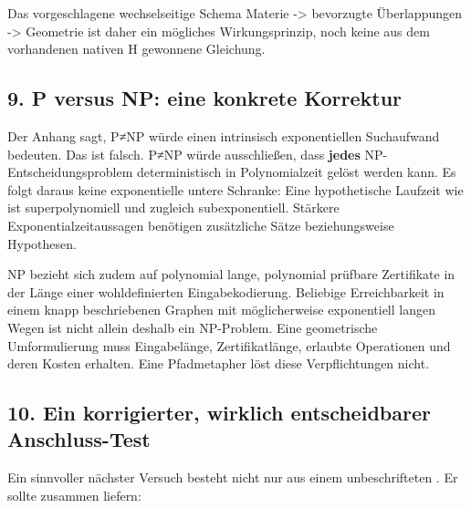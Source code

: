 Das vorgeschlagene wechselseitige Schema Materie -\textgreater{}
bevorzugte Überlappungen -\textgreater{} Geometrie ist daher ein
mögliches Wirkungsprinzip, noch keine aus dem vorhandenen nativen H
gewonnene Gleichung.

\subsection{9. P versus NP: eine konkrete
Korrektur}\label{p-versus-np-eine-konkrete-korrektur}

Der Anhang sagt, P≠NP würde einen intrinsisch exponentiellen Suchaufwand
bedeuten. Das ist falsch. P≠NP würde ausschließen, dass \textbf{jedes}
NP-Entscheidungsproblem deterministisch in Polynomialzeit gelöst werden
kann. Es folgt daraus keine exponentielle untere Schranke: Eine
hypothetische Laufzeit wie  ist
superpolynomiell und zugleich subexponentiell. Stärkere
Exponentialzeitaussagen benötigen zusätzliche Sätze beziehungsweise
Hypothesen.

NP bezieht sich zudem auf polynomial lange, polynomial prüfbare
Zertifikate in der Länge einer wohldefinierten Eingabekodierung.
Beliebige Erreichbarkeit in einem knapp beschriebenen Graphen mit
möglicherweise exponentiell langen Wegen ist nicht allein deshalb ein
NP-Problem. Eine geometrische Umformulierung muss Eingabelänge,
Zertifikatlänge, erlaubte Operationen und deren Kosten erhalten. Eine
Pfadmetapher löst diese Verpflichtungen nicht.

\subsection{10. Ein korrigierter, wirklich entscheidbarer
Anschluss-Test}\label{ein-korrigierter-wirklich-entscheidbarer-anschluss-test}

Ein sinnvoller nächster Versuch besteht nicht nur aus einem
unbeschrifteten . Er sollte zusammen liefern:

